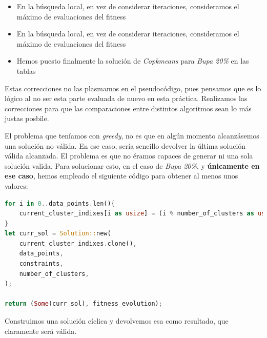 \documentclass[11pt]{article}
\begin{document}
\begin{itemize}
    \item En la búsqueda local, en vez de considerar iteraciones, consideramos el máximo de evaluaciones del fitness
    \item En la búsqueda local, en vez de considerar iteraciones, consideramos el máximo de evaluaciones del fitness
    \item Hemos puesto finalmente la solución de \emph{Copkmeans} para \emph{Bupa 20\%} en las tablas
\end{itemize}

Estas correcciones no las plasmamos en el pseudocódigo, pues pensamos que es lo lógico al no ser esta parte evaluada de nuevo en esta práctica. Realizamos las correcciones para que las comparaciones entre distintos algoritmos sean lo más justas posbile.

El problema que teníamos con \emph{greedy}, no es que en algún momento alcanzásemos una solución no válida. En ese caso, sería sencillo devolver la última solución válida alcanzada. El problema es que no éramos capaces de generar ni una sola solución valida. Para solucionar esto, en el caso de \emph{Bupa 20\%}, y \textbf{únicamente en ese caso}, hemos empleado el siguiente código para obtener al menos unos valores:


\begin{lstlisting}[language=Rust, style=Boxed]
for i in 0..data_points.len(){
    current_cluster_indixes[i as usize] = (i % number_of_clusters as usize) as u32;
}
let curr_sol = Solution::new(
    current_cluster_indixes.clone(),
    data_points,
    constraints,
    number_of_clusters,
);

return (Some(curr_sol), fitness_evolution);
\end{lstlisting}

Construimos una solución cíclica y devolvemos esa como resultado, que claramente será válida.
\end{document}
